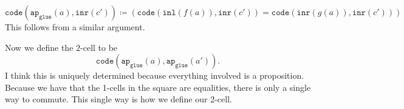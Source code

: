 \documentclass[11pt]{amsart}
\newcommand{\type}[1]{\mathtt{#1}}
\begin{document}
\vspace{2em}

$ 
\type{ code } \left( \type{ ap }_{ \type{ glue } } ( a ) , \type{ inr } ( c' ) \right) \coloneqq 
	\left( 
		\type{ code } ( \type{ inl } ( f ( a ) ) , \type{ inr } ( c' ) ) =
		\type{ code } ( \type{ inr } ( g ( a ) ) , \type{ inr } ( c' ) ) 
	\right) 
$ 
This follows from a similar argument.

\vspace{2em}

Now we define the $2$-cell to be
\[
	\type{ code } ( \type{ ap }_\type{ glue } ( a ) , \type{ ap }_\type{ glue } ( a' )  ) .
\]
I think this is uniquely determined because
everything involved is a proposition. 
Because we have that the 1-cells 
in the square are equalities,
there is only a single way to commute.
This single way is how we define our 2-cell. 



\end{document}
